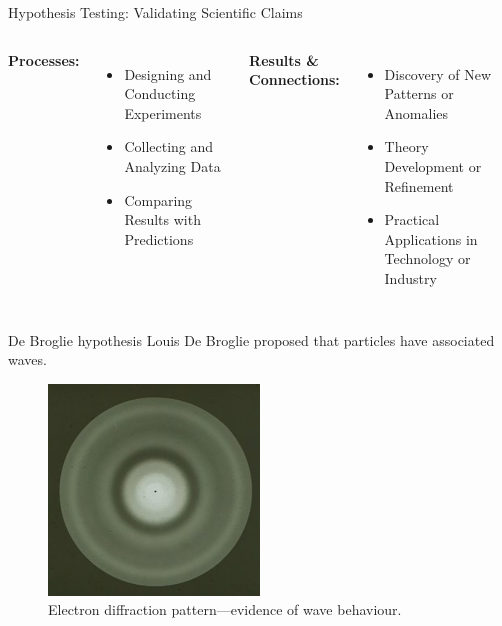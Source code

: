 \begin{frame}{Hypothesis Testing: Validating Scientific Claims}
  \begin{columns}
    \textbf{Processes:}
    \begin{itemize}
      \item Designing and Conducting Experiments
      \item Collecting and Analyzing Data
      \item Comparing Results with Predictions
    \end{itemize}

    \textbf{Results \& Connections:}
    \begin{itemize}
      \item Discovery of New Patterns or Anomalies
      \item Theory Development or Refinement
      \item Practical Applications in Technology or Industry
    \end{itemize}
  \end{columns}
\end{frame}

\begin{frame}{De Broglie hypothesis}
  \vspace{0.2cm}
  Louis De Broglie proposed that particles have associated waves. \cite{Broglie2021}

  \begin{figure}
    \centering
    \includegraphics[width=0.5\textwidth]{Figures/electron-diffraction.jpg}
    \caption{Electron diffraction pattern—evidence of wave behaviour. \cite{NorbertMitzel2022}}
  \end{figure}
\end{frame}

